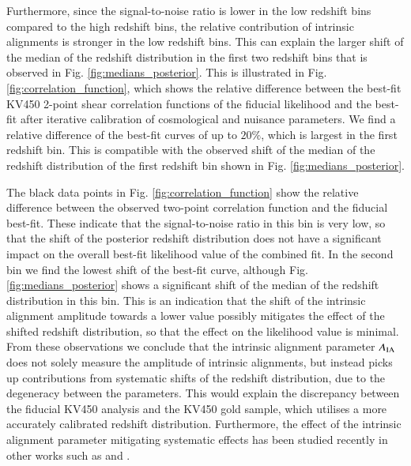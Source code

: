 \documentclass{aa}
\begin{document}
Furthermore, since the signal-to-noise ratio is lower in the low redshift bins compared to the high redshift bins, the relative contribution of intrinsic alignments is stronger in the low redshift bins. This can explain the larger shift of the median of the redshift distribution in the first two redshift bins that is observed in Fig. \ref{fig:medians_posterior}. This is illustrated in Fig. \ref{fig:correlation_function}, which shows the relative difference between the best-fit KV450 2-point shear correlation functions of the fiducial likelihood and the best-fit after iterative calibration of cosmological and nuisance parameters. We find a relative difference of the best-fit curves of up to $20 \%$, which is largest in the first redshift bin. This is compatible with the observed shift of the median of the redshift distribution of the first redshift bin shown in Fig. \ref{fig:medians_posterior}. 

The black data points in Fig. \ref{fig:correlation_function} show the relative difference between the observed two-point correlation function and the fiducial best-fit. These indicate that the signal-to-noise ratio in this bin is very low, so that the shift of the posterior redshift distribution does not have a significant impact on the overall best-fit likelihood value of the combined fit. In the second bin we find the lowest shift of the best-fit curve, although Fig. \ref{fig:medians_posterior} shows a significant shift of the median of the redshift distribution in this bin. This is an indication that the shift of the intrinsic alignment amplitude towards a lower value possibly mitigates the effect of the shifted redshift distribution, so that the effect on the likelihood value is minimal. From these observations we conclude that the intrinsic alignment parameter $A_{\rm IA}$ does not solely measure the amplitude of intrinsic alignments, but instead picks up contributions from systematic shifts of the redshift distribution, due to the degeneracy between the parameters. This would explain the discrepancy between the fiducial KV450 analysis and the KV450 gold sample, which utilises a more accurately calibrated redshift distribution. Furthermore, the effect of the intrinsic alignment parameter mitigating systematic effects has been studied recently in other works such as \cite{vanUitert18} and \cite{Efstathiou18}.
\end{document}
